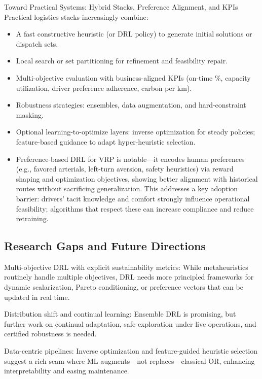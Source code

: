 Toward Practical Systems: Hybrid Stacks, Preference Alignment, and KPIs
Practical logistics stacks increasingly combine:

\begin{itemize}
    \item A fast constructive heuristic (or DRL policy) to generate initial solutions or dispatch sets.
    \item Local search or set partitioning for refinement and feasibility repair.

    \item Multi-objective evaluation with business-aligned KPIs (on-time \%, capacity utilization, driver preference adherence, carbon per km).

    \item Robustness strategies: ensembles, data augmentation, and hard-constraint masking.
    
    \item Optional learning-to-optimize layers: inverse optimization for steady policies; feature-based guidance to adapt hyper-heuristic selection.
    
    \item Preference-based DRL for VRP is notable—it encodes human preferences (e.g., favored arterials, left-turn aversion, safety heuristics) via reward shaping and optimization objectives, showing better alignment with historical routes without sacrificing generalization. This addresses a key adoption barrier: drivers’ tacit knowledge and comfort strongly influence operational feasibility; algorithms that respect these can increase compliance and reduce retraining.
\end{itemize}


\subsection{Research Gaps and Future Directions}

Multi-objective DRL with explicit sustainability metrics: While metaheuristics routinely handle multiple objectives, DRL needs more principled frameworks for dynamic scalarization, Pareto conditioning, or preference vectors that can be updated in real time.​

Distribution shift and continual learning: Ensemble DRL is promising, but further work on continual adaptation, safe exploration under live operations, and certified robustness is needed.​

Data-centric pipelines: Inverse optimization and feature-guided heuristic selection suggest a rich seam where ML augments—not replaces—classical OR, enhancing interpretability and easing maintenance.​

